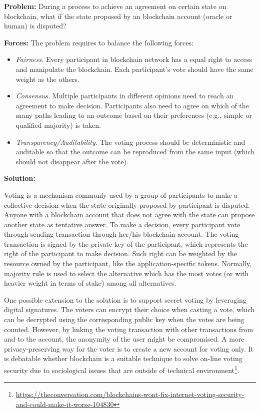 \vspace{0.5em}\noindent \textbf{Problem:} 
During a process to achieve an agreement on certain state on blockchain, what if the state proposed by an blockchain account (oracle or human) is disputed? 


\vspace{0.5em}\noindent \textbf{Forces:} The problem requires to balance the following forces:
\begin{itemize}
  \item \textit{Fairness.} Every participant in blockchain network has a equal right to access and manipulate the blockchain. Each participant's vote should have the same weight as the others. 
  \item \textit{Consensus.} Multiple participants in different opinions need to reach an agreement to make decision. Participants also need to agree on which of the many paths leading to an outcome based on their preferences (e.g., simple or qualified majority) is taken.
  \item \textit{Transparency/Auditability.} The voting process should be deterministic and auditable so that the outcome can be reproduced from the same input (which should not disappear after the vote).
\end{itemize}

\vspace{0.5em}\noindent \textbf{Solution:} 

Voting is a mechanism commonly used by a group of participants to make a collective decision when the state originally proposed by participant is disputed. Anyone with a blockchain account that does not agree with the state can propose another state as tentative answer. To make a decision, every participant vote through sending transaction through her/his blockchain account. The voting transaction is signed by the private key of the participant, which represents the right of the participant to make decision. Such right can be weighted by the resource owned by the participant, like the application-specific tokens. Normally, majority rule is used to select the alternative which has the most votes (or with heavier weight in terms of stake) among all alternatives. 

One possible extension to the solution is to support secret voting by leveraging digital signatures. The voters can encrypt their choice when casting a vote, which can be decrypted using the corresponding public key when the votes are being counted. However, by linking the voting transaction with other transactions from and to the account, the anonymity of the user might be compromised. A more privacy-preserving way for the voter is to create a new account for voting only. It is debatable whether blockchain is a suitable technique to solve on-line voting security due to sociological issues that are outside of technical environment\footnote{\url{https://theconversation.com/blockchains-wont-fix-internet-voting-security-and-could-make-it-worse-104830}}. 


